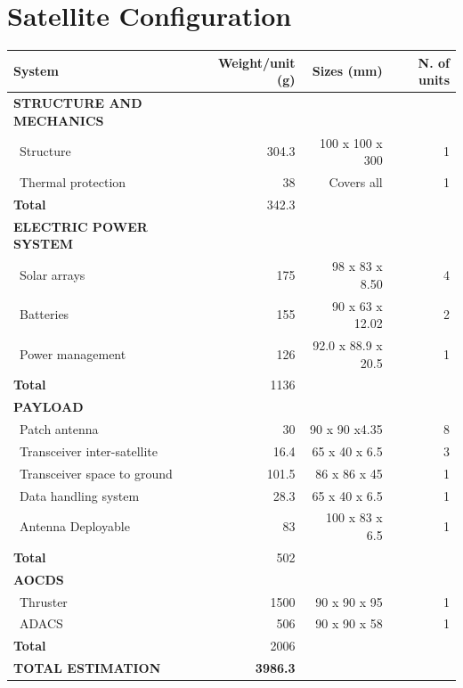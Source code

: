 \section{Satellite Configuration}

\begin{longtable}{| l | r | r | r |}
	\hline
	\rowcolor[gray]{0.80}	\textbf{System}& \textbf{Weight/unit (g)} & \textbf{Sizes (mm)} & \textbf{N. of units}\\
	\hline
	\hline
	\endfirsthead
	
	
	\rowcolor[gray]{0.85} \textbf{STRUCTURE AND MECHANICS} & & & \\ \hline
	
	~Structure & 304.3 & 100 x 100 x 300& 1 \\
	~Thermal protection & 38 & Covers all & 1\\
	\hline 
	\rowcolor[gray]{0.95} \textbf{Total} & 342.3 & &  \\
	\hline \hline
	
	\rowcolor[gray]{0.85} \textbf{ELECTRIC POWER SYSTEM} & & & \\\hline
	
	~Solar arrays & 175 & 98 x 83 x 8.50 & 4 \\
	~Batteries & 155 & 90 x 63 x 12.02 & 2 \\
	~Power management & 126 & 92.0 x 88.9 x 20.5 & 1 \\
	\hline
	\rowcolor[gray]{0.95} \textbf{Total} & 1136 &  &  \\
	\hline \hline
	
	\rowcolor[gray]{0.85} \textbf{PAYLOAD} & & & \\ \hline
	
	~Patch antenna & 30 & 90 x 90 x4.35& 8 \\
	~Transceiver inter-satellite & 16.4 & 65 x 40 x 6.5 & 3 \\
	~Transceiver space to ground & 101.5 & 86 x 86 x 45 & 1 \\
	~Data handling system & 28.3 & 65 x 40 x 6.5 & 1\\
	~Antenna Deployable & 83 & 100 x 83 x 6.5 &1\\
	\hline
	\rowcolor[gray]{0.95} \textbf{Total} & 502 &  & \\
	\hline \hline \hline
	
	\rowcolor[gray]{0.85} \textbf{AOCDS} & & &\\ \hline
	
	~Thruster & 1500 & 90 x 90 x 95 & 1 \\
	~ADACS & 506 & 90 x 90 x 58 & 1 \\
	\hline
	\rowcolor[gray]{0.95} \textbf{Total} & 2006 &  & \\
	\hline \hline
	
	\rowcolor[gray]{0.9} \textbf{TOTAL ESTIMATION} & \textbf{3986.3} & & \\ \hline
	
	
\end{longtable} 

